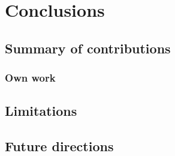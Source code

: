 \chapter{Conclusions}

\section{Summary of contributions}

\subsection{Own work}

\section{Limitations}

\section{Future directions}
